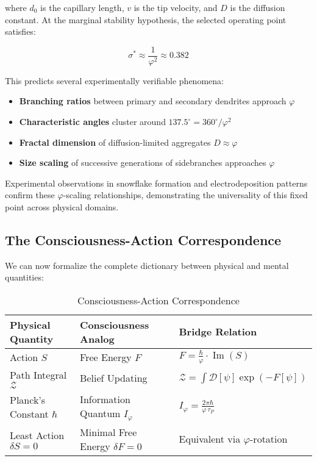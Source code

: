 \documentclass[14pt, a4paper]{extarticle}
\begin{document}
where $d_0$ is the capillary length, $v$ is the tip velocity, and $D$ is the diffusion constant. At the marginal stability hypothesis, the selected operating point satisfies:

\begin{equation}
\sigma^* \approx \frac{1}{\varphi^2} \approx 0.382
\end{equation}

This predicts several experimentally verifiable phenomena:

\begin{itemize}
\item \textbf{Branching ratios} between primary and secondary dendrites approach $\varphi$
\item \textbf{Characteristic angles} cluster around $137.5^\circ = 360^\circ/\varphi^2$  
\item \textbf{Fractal dimension} of diffusion-limited aggregates $D \approx \varphi$
\item \textbf{Size scaling} of successive generations of sidebranches approaches $\varphi$
\end{itemize}

Experimental observations in snowflake formation and electrodeposition patterns confirm these $\varphi$-scaling relationships, demonstrating the universality of this fixed point across physical domains.

\subsection{The Consciousness-Action Correspondence}

We can now formalize the complete dictionary between physical and mental quantities:

\begin{table}[h]
\centering
\caption{Consciousness-Action Correspondence}
\begin{tabular}{lll}
\toprule
\textbf{Physical Quantity} & \textbf{Consciousness Analog} & \textbf{Bridge Relation} \\
\midrule
Action $S$ & Free Energy $F$ & $F = \frac{\hbar}{\varphi} \cdot \operatorname{Im}(S)$ \\
Path Integral $\mathcal{Z}$ & Belief Updating & $\mathcal{Z} = \int \mathcal{D}[\psi] \exp(-F[\psi])$ \\
Planck's Constant $\hbar$ & Information Quantum $I_\varphi$ & $I_\varphi = \frac{2\pi\hbar}{\varphi \, \tau_P}$ \\
Least Action $\delta S = 0$ & Minimal Free Energy $\delta F = 0$ & Equivalent via $\varphi$-rotation \\
\bottomrule
\end{tabular}
\end{table}
\end{document}
